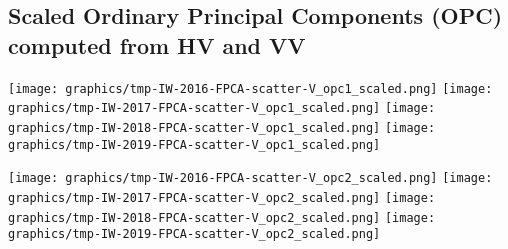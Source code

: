 \subsection{Scaled Ordinary Principal Components (OPC) computed from HV and VV}
\label{FPCA-scatter-opc-scaled}

\begin{center}
\begin{minipage}{7.0in}
\texttt{[image: graphics/tmp-IW-2016-FPCA-scatter-V\_opc1\_scaled.png]}
\quad
\texttt{[image: graphics/tmp-IW-2017-FPCA-scatter-V\_opc1\_scaled.png]}
\vskip 1.0cm
\texttt{[image: graphics/tmp-IW-2018-FPCA-scatter-V\_opc1\_scaled.png]}
\quad
\texttt{[image: graphics/tmp-IW-2019-FPCA-scatter-V\_opc1\_scaled.png]}
\end{minipage}
\end{center}


\clearpage
\begin{center}
\begin{minipage}{7.0in}
\texttt{[image: graphics/tmp-IW-2016-FPCA-scatter-V\_opc2\_scaled.png]}
\quad
\texttt{[image: graphics/tmp-IW-2017-FPCA-scatter-V\_opc2\_scaled.png]}
\vskip 1.0cm
\texttt{[image: graphics/tmp-IW-2018-FPCA-scatter-V\_opc2\_scaled.png]}
\quad
\texttt{[image: graphics/tmp-IW-2019-FPCA-scatter-V\_opc2\_scaled.png]}
\end{minipage}
\end{center}


\renewcommand{\theenumi}{\roman{enumi}}
\renewcommand{\labelenumi}{\textnormal{(\theenumi)}$\;\;$}


